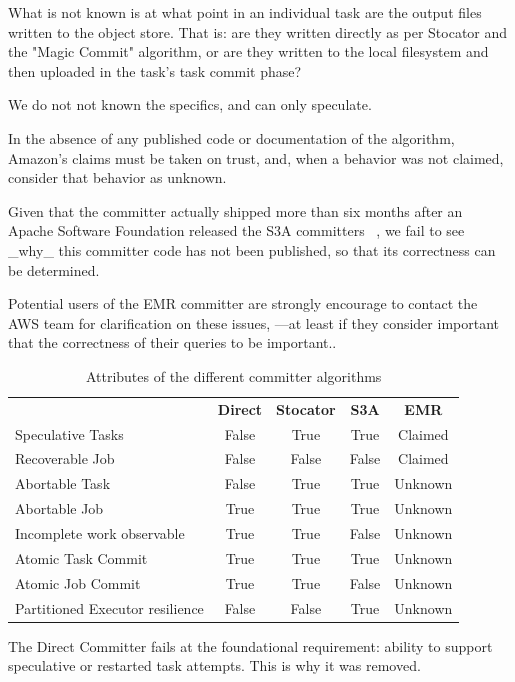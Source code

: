 \documentclass[conference]{IEEEtran}
\begin{document}
What is not known is at what point in an individual task are the output files
written to the object store.
That is: are they written directly as per Stocator and the "Magic Commit" algorithm,
or  are they written to the local filesystem and then uploaded in the task's 
task commit phase?

We do not not known the specifics, and can only speculate.

In the absence of any published code or documentation of the algorithm, Amazon's
claims must be taken on trust, and, when a behavior was not claimed,
consider that behavior as unknown.

Given that the committer actually shipped more than six months
after an Apache Software Foundation released the S3A committers
\ \cite{HADOOP-S3A-Committers}, we fail to see _why_ this committer code
has not been published, so that its correctness can be determined.

Potential users of the EMR committer are strongly encourage to contact
the AWS team for clarification on these issues, ---at least if they consider
important that the correctness of their queries to be important..


\begin{table}
  \begin{tabular}{ l c c c c }
    \hline
    & \textbf{Direct} & \textbf{Stocator} & \textbf{S3A} & \textbf{EMR}\\
    Speculative Tasks & False & True & True & Claimed \\
    Recoverable Job   & False & False & False & Claimed \\
    Abortable Task    & False & True & True & Unknown \\
    Abortable Job     & True & True & True & Unknown \\
    Incomplete work observable & True & True & False & Unknown\\
    Atomic Task Commit & True & True & True & Unknown \\
    Atomic Job Commit & True & True & False & Unknown \\
    Partitioned Executor resilience & False & False & True & Unknown\\
    \hline
  \end{tabular}
\caption{Attributes of the different committer algorithms}
\label{tab:other-committer-attributes}
\end{table}


The Direct Committer fails at the foundational requirement: ability to support
speculative or restarted task attempts.
This is why it was removed.
\end{document}
